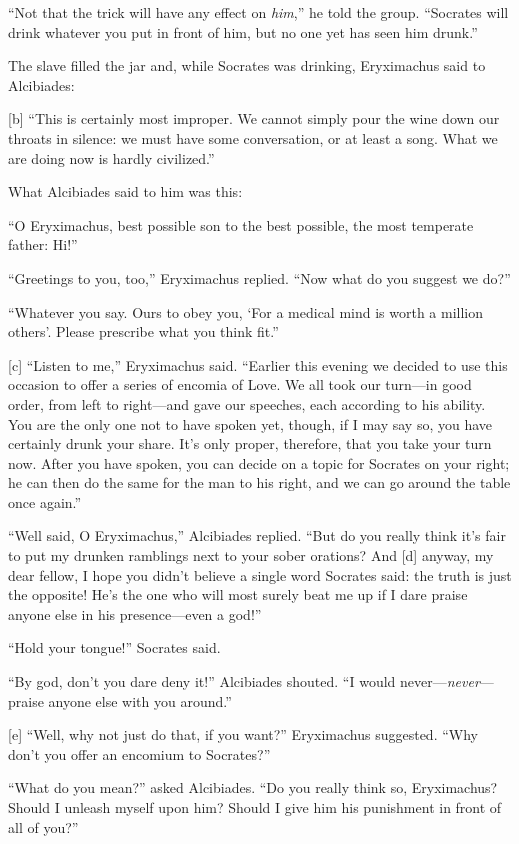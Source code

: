 “Not that the trick will have any effect on {\em him},” he told the
group. “Socrates will drink whatever you put in front of him, but no one
yet has seen him drunk.”

The slave filled the jar and, while Socrates was drinking, Eryximachus
said to Alcibiades:

{[}b{]} “This is certainly most improper. We cannot simply pour the wine
down our throats in silence: we must have some conversation, or at least
a song. What we are doing now is hardly civilized.”

What Alcibiades said to him was this:

“O Eryximachus, best possible son to the best possible, the most
temperate father: Hi!”

“Greetings to you, too,” Eryximachus replied. “Now what do you suggest
we do?”

“Whatever you say. Ours to obey you, ‘For a medical mind is worth a
million others'.
Please prescribe what you think fit.”

{[}c{]} “Listen to me,” Eryximachus said. “Earlier this evening we
decided to use this occasion to offer a series of encomia of Love. We
all took our turn---in good order, from left to right---and gave our
speeches, each according to his ability. You are the only one not to
have spoken yet, though, if I may say so, you have certainly drunk your
share. It's only proper, therefore, that you take your turn now. After
you have spoken, you can decide on a topic for Socrates on your right;
he can then do the same for the man to his right, and we can go around
the table once again.”

“Well said, O Eryximachus,” Alcibiades replied. “But do you really think
it's fair to put my drunken ramblings next to your sober orations? And
{[}d{]} anyway, my dear fellow, I hope you didn't believe a single word
Socrates said: the truth is just the opposite! He's the one who will
most surely beat me up if I dare praise anyone else in his
presence---even a god!”

“Hold your tongue!” Socrates said.

“By god, don't you dare deny it!” Alcibiades shouted. “I would
never---{\em never}---praise anyone else with you around.”

{[}e{]} “Well, why not just do that, if you want?” Eryximachus
suggested. “Why don't you offer an encomium to Socrates?”

“What do you mean?” asked Alcibiades. “Do you really think so,
Eryximachus? Should I unleash myself upon him? Should I give him his
punishment in front of all of you?”

